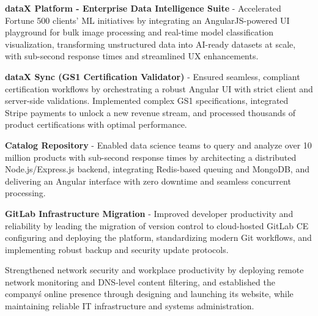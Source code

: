 \begin{sectionContainer}
	\vspace{0.4em}\noindent\normalsize\textbf{dataX Platform - Enterprise Data Intelligence Suite} - Accelerated Fortune 500 clients' ML initiatives by integrating an AngularJS-powered UI playground for bulk image processing and real-time model classification visualization, transforming unstructured data into AI-ready datasets at scale, with sub-second response times and streamlined UX enhancements.
\end{sectionContainer}

\begin{sectionContainer}
	\vspace{0.4em}\noindent\normalsize\textbf{dataX Sync (GS1 Certification Validator)} - Ensured seamless, compliant certification workflows by orchestrating a robust Angular UI with strict client and server-side validations. Implemented complex GS1 specifications, integrated Stripe payments to unlock a new revenue stream, and processed thousands of product certifications with optimal performance.
\end{sectionContainer}

\begin{sectionContainer}
	\vspace{0.4em}\noindent\normalsize\textbf{Catalog Repository} - Enabled data science teams to query and analyze over 10 million products with sub-second response times by architecting a distributed Node.js/Express.js backend, integrating Redis-based queuing and MongoDB, and delivering an Angular interface with zero downtime and seamless concurrent processing.
\end{sectionContainer}

\begin{sectionContainer}
	\vspace{0.4em}\noindent\normalsize\textbf{GitLab Infrastructure Migration} - Improved developer productivity and reliability by leading the migration of version control to cloud-hosted GitLab CE configuring and deploying the platform, standardizing modern Git workflows, and implementing robust backup and security update protocols.
\end{sectionContainer}


\begin{sectionContainer}
	Strengthened network security and workplace productivity by deploying remote network monitoring and DNS-level content filtering, and established the company\'s online presence through designing and launching its website, while maintaining reliable IT infrastructure and systems administration.
\end{sectionContainer}
\nopagebreak[4]